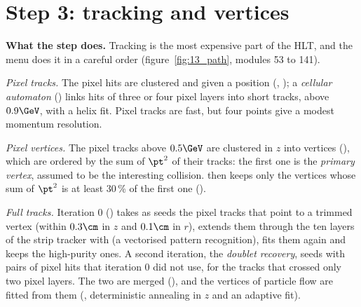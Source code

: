 \FloatBarrier
\section{Step 3: tracking and vertices}

\textbf{What the step does.} Tracking is the most expensive part of the HLT, and the menu does it in a careful order
(figure~\ref{fig:13_path}, modules 53 to 141).

\emph{Pixel tracks.} The pixel hits are clustered and given a position (,
); a \emph{cellular automaton} () links hits of three or four pixel
layers into short tracks, above $0.9\GeV$, with a helix fit. Pixel tracks are fast, but four points give a modest
momentum resolution.

\emph{Pixel vertices.} The pixel tracks above $0.5\GeV$ are clustered in $z$ into vertices (),
which are ordered by the sum of $\pt^2$ of their tracks: the first one is the \emph{primary vertex}, assumed to be
the interesting collision.  then keeps only the vertices whose sum of $\pt^2$ is at least
30\,\% of the first one ().

\emph{Full tracks.} Iteration 0 () takes as seeds the pixel tracks that
point to a trimmed vertex (within $0.3\cm$ in $z$ and $0.1\cm$ in $r$), extends them through the ten layers of the
strip tracker with  (a vectorised pattern recognition), fits them again and keeps the high-purity ones. A
second iteration, the \emph{doublet recovery}, seeds with pairs of pixel hits that iteration 0 did not use, for the
tracks that crossed only two pixel layers. The two are merged (), and the vertices of particle
flow are fitted from them (, deterministic annealing in $z$ and an adaptive fit).

